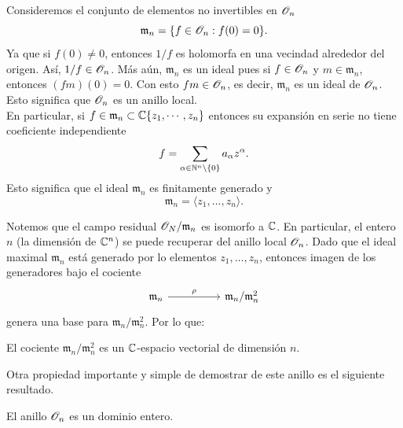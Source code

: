 \begin{remark}
	Consideremos el conjunto de elementos no invertibles en $\mathscr{O}_{n}$
	\begin{equation*}
		\mathfrak{m}_n=\{f\in\mathscr{O}_{n}:f(0)=0\}.
	\end{equation*}
	Ya que si $f(0)\neq 0$, entonces $1/f$ es holomorfa en una vecindad alrededor del origen. Así, $1/f\in\mathscr{O}_{n}$. Más aún, $\mathfrak{m}_n$ es un ideal pues si $f\in\mathscr{O}_{n}$ y $m\in\mathfrak{m}_n$, entonces $(fm)(0)=0$. Con esto $fm\in\mathscr{O}_{n}$, es decir, $\mathfrak{m}_n$ es un ideal de $\mathscr{O}_{n}$. Esto significa que $\mathscr{O}_{n}$ es un anillo local.\\
	En particular, si $f\in\mathfrak{m}_n\subset \mathbb{C}\{z_1,\cdots,z_n\}$ entonces su expansión en serie no tiene coeficiente independiente
	\begin{equation*}
		f=\sum_{\alpha\in\mathbb{N}^n\setminus\{0\}}a_\alpha z^{\alpha}.
	\end{equation*}
	Esto significa que el ideal $\mathfrak{m}_n$ es finitamente generado y
	\begin{equation*}
		\mathfrak{m}_n=\langle z_1,\dots,z_n \rangle.
	\end{equation*}
\end{remark}
Notemos que el campo residual $\mathscr{O}_{N}/\mathfrak{m}_n$ es isomorfo a $\mathbb{C}$. En particular, el entero $n$ (la dimensión de $\mathbb{C}^n$) se puede recuperar del anillo local $\mathscr{O}_{n}$. Dado que el ideal maximal $\mathfrak{m}_n$ está generado por lo elementos $z_1,\dots,z_n$, entonces imagen de los generadores bajo el cociente
\[\begin{tikzcd}
	{\mathfrak{m}_n} && {\mathfrak{m}_n/\mathfrak{m}_n^2}
	\arrow["\rho", from=1-1, to=1-3]
\end{tikzcd}\]
genera una base para $\mathfrak{m}_n/\mathfrak{m}_n^2$. Por lo que:
\begin{corollary}
	El cociente $\mathfrak{m}_n/\mathfrak{m}_n^2$ es un $\mathbb{C}$-espacio vectorial de dimensión $n$.
\end{corollary}

Otra propiedad importante y simple de demostrar de este anillo es el siguiente resultado.

\begin{propo}
	El anillo $\mathscr{O}_{n}$ es un dominio entero.
\end{propo}

